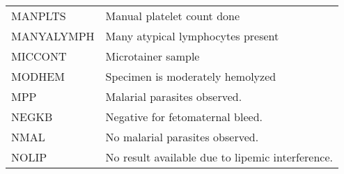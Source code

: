 \begin{fullwidth}
\begin{longtable}{p{.20\linewidth} p{.75\linewidth}}
MANPLTS     & Manual platelet count done                                                                                                                                                                                                                                                                   \\
MANYALYMPH  & Many atypical lymphocytes present                                                                                                                                                                                                                                                            \\
MICCONT     & Microtainer sample                                                                                                                                                                                                                                                                           \\
MODHEM      & Specimen is moderately hemolyzed                                                                                                                                                                                                                                                             \\
MPP         & Malarial parasites observed.                                                                                                                                                                                                                                                                 \\
NEGKB       & Negative for fetomaternal bleed.                                                                                                                                                                                                                                                             \\
NMAL        & No malarial parasites observed.                                                                                                                                                                                                                                                              \\
NOLIP       & No result available due to lipemic interference.                                                                                                                                                                                                                                             \\

\end{longtable}
\end{fullwidth}
